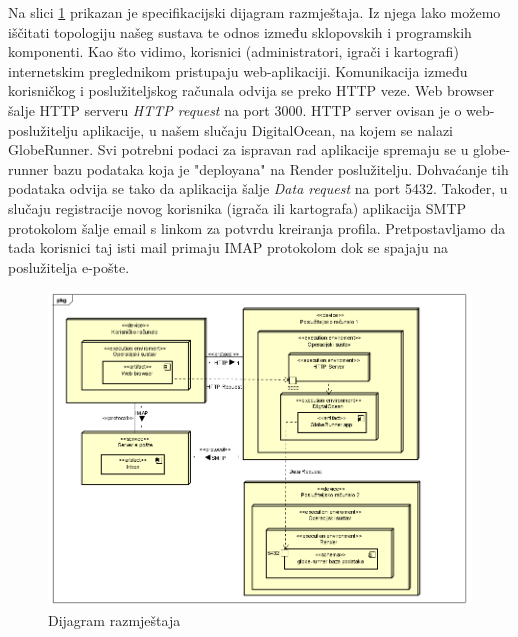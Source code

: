 			
			
			Na slici \ref{fig:DeploymentDiagram} prikazan je specifikacijski dijagram razmještaja. Iz njega lako možemo iščitati topologiju našeg sustava te odnos između sklopovskih i programskih komponenti. Kao što vidimo, korisnici (administratori, igrači i kartografi) internetskim preglednikom pristupaju web-aplikaciji. Komunikacija između korisničkog i poslužiteljskog računala odvija se preko HTTP veze. Web browser šalje HTTP serveru \textit{HTTP request} na port 3000. HTTP server ovisan je o web-poslužitelju aplikacije, u našem slučaju DigitalOcean, na kojem se nalazi GlobeRunner. Svi potrebni podaci za ispravan rad aplikacije spremaju se u globe-runner bazu podataka koja je "deployana" na Render poslužitelju. Dohvaćanje tih podataka odvija se tako da aplikacija šalje \textit{Data request} na port 5432. Također, u slučaju registracije novog korisnika (igrača ili kartografa) aplikacija SMTP protokolom šalje email s linkom za potvrdu kreiranja profila. Pretpostavljamo da tada korisnici taj isti mail primaju IMAP protokolom dok se spajaju na poslužitelja e-pošte.

			 \begin{figure}[H]
        			\includegraphics[width=\textwidth]{slike/deploymentdiagram.png}
        			\centering
        			\caption{Dijagram razmještaja}
        			\label{fig:DeploymentDiagram}
        		\end{figure}
			
